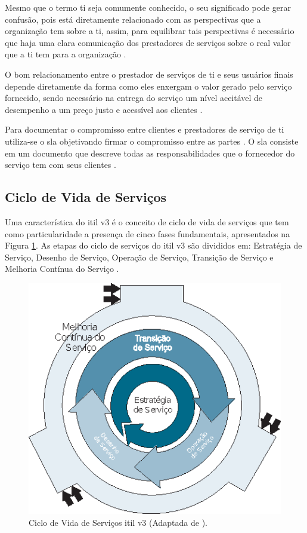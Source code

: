 Mesmo que o termo \acrshort{ti} seja comumente conhecido, o seu significado pode gerar confusão, pois está diretamente relacionado com as perspectivas que a organização tem sobre a \acrshort{ti}, assim, para equilibrar tais perspectivas é necessário que haja uma clara comunicação dos prestadores de serviços sobre o real valor que a \acrshort{ti} tem para a organização \cite{servicestrategy}.

O bom relacionamento entre o prestador de serviços de \acrshort{ti} e seus usuários finais depende diretamente da forma como eles enxergam o valor gerado pelo serviço fornecido, sendo necessário na entrega do serviço um nível aceitável de desempenho a um preço justo e acessível aos clientes \cite{servicestrategy}.

Para documentar o compromisso entre clientes e prestadores de serviço de \acrshort{ti} utiliza-se o \gls{sla} objetivando firmar o compromisso entre as partes \cite{introductoryoverviewofitil}. O \acrshort{sla} consiste em um documento que descreve todas as responsabilidades que o fornecedor do serviço tem com seus clientes \cite{servicestrategy}.


\subsection{Ciclo de Vida de Serviços}

\noindent Uma característica do \acrshort{itil} v3 é o conceito de ciclo de vida de serviços que tem como particularidade a presença de cinco fases fundamentais, apresentados na Figura \ref{fig-ciclo-de-vida-itil}. As etapas do ciclo de serviços do \acrshort{itil} v3 são divididos em: Estratégia de Serviço, Desenho de Serviço, Operação de Serviço, Transição de Serviço e Melhoria Contínua do Serviço \cite{servicestrategy, introductoryoverviewofitil}.

\begin{figure}[!ht]
  \centering
  \includegraphics[width=.70\textwidth]{figuras/ciclo_itil.eps} 
  \caption{Ciclo de Vida de Serviços \acrshort{itil} v3 (Adaptada de \cite{servicestrategy}).}
  \label{fig-ciclo-de-vida-itil} 
\end{figure}

